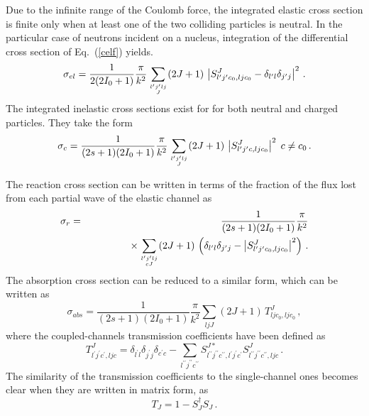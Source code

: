 \documentclass[twocolumn,amsmath,amssymb,10pt,groupedaddress,letter]{revtex4}
\begin{document}
Due to the infinite range of the Coulomb force, the integrated elastic
cross section is finite only when at least one of the two colliding
particles is neutral. In the particular case of neutrons incident
on a nucleus, integration of the differential cross section of Eq.~(\ref{celf})
yields. \begin{equation}
\sigma_{el}=\frac{1}{2(2I_{0}+1)}\frac{\pi}{k^{2}}\sum_{{{l^{\prime}j^{\prime}lj\atop J}}}(2J+1)\,\left|S_{l^{\prime}j^{\prime}c_{0},ljc_{0}}^{J}-\delta_{l^{\prime}l}\delta_{j^{\prime}j}\right|^{2}\,.\end{equation}
 The integrated inelastic cross sections exist for for both neutral
and charged particles. They take the form \begin{equation}
\sigma_{c}=\frac{1}{(2s+1)(2I_{0}+1)}\frac{\pi}{k^{2}}\sum_{{{l^{\prime}j^{\prime}lj\atop J}}}(2J+1)\,\left|S_{l^{\prime}j^{\prime}c,ljc_{0}}^{J}\right|^{2}\; c\neq c_{0}\,.\end{equation}

The reaction cross section can be written in terms of the fraction of
the flux lost from each partial wave of the elastic channel as
\begin{eqnarray}
\sigma_{r} & = & \frac{1}{(2s+1)(2I_{0}+1)}\frac{\pi}{k^{2}} \\
& & \qquad\qquad\times\sum_{{{l^{\prime}j^{\prime}lj\atop cJ}}}(2J+1)\,\left(\delta_{l^{\prime}l}\delta_{j^{\prime}j}-\left|S_{l^{\prime}j^{\prime}c_{0},ljc_{0}}^{J}\right|^{2}\right)\,.\nonumber\end{eqnarray}
The absorption cross section can be reduced to a similar
form, which can be written as \begin{equation}
\sigma_{abs}=\frac{1}{(2s+1)(2I_{0}+1)}\frac{\pi}{k^{2}}\sum_{ljJ}(2J+1)\, T_{ljc_{0},ljc_{0}}^{J}\,,\end{equation}
 where the coupled-channels transmission coefficients have been
defined as \begin{equation}
T_{l^{\prime}j^{\prime}c^{\prime},ljc}^{J}=\delta_{l^{\prime}l}\delta_{j^{\prime}j}\delta_{c^{\prime}c}-\sum_{l^{\prime\prime}j^{\prime\prime}c^{\prime\prime}}S_{l^{\prime\prime}j^{\prime\prime}c^{\prime\prime},l^{\prime}j^{\prime}c^{\prime}}^{J*}S_{l^{\prime\prime}j^{\prime\prime}c^{\prime\prime},ljc}^{J}\,.\end{equation}
 The similarity of the transmission coefficients to the single-channel
ones becomes clear when they are written in matrix form, as \begin{equation}
T_{J}=1-S_{J}^{\dagger}S_{J}\,.\end{equation}
\end{document}
